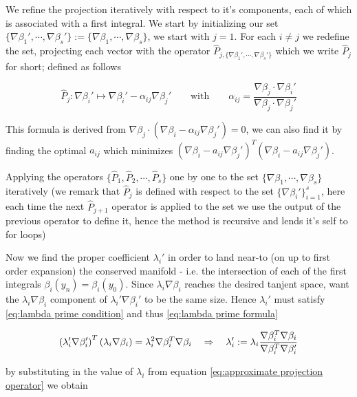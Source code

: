 \documentclass[12pt]{article}
\begin{document}
We refine the projection iteratively with respect to it's components, each of which is associated with a first integral. We start by initializing our set $\{\nabla \beta_1' ,\cdots , \nabla\beta_s'\} := \{\nabla \beta_1 ,\cdots ,\nabla \beta_s \}$, we start with $j=1$. For each $i\neq j$ we redefine the set, projecting each vector with the operator $\hat P_{j,\{\nabla\beta_1',\cdots,\nabla\beta_s'\}}$ which we write $\hat P_{j}$ for short; defined as follows

\begin{equation}\label{eq:first coefficient}
    \hat P_j : \nabla\beta_i' \mapsto \nabla\beta_i' - \alpha_{ij}\nabla\beta_j' \qquad\text{with}\qquad \alpha_{ij} = \frac{\nabla\beta_j \cdot\nabla\beta_i'}{\nabla\beta_j\cdot\nabla\beta_j'} 
\end{equation}

This formula is derived from $\nabla\beta_j\cdot (\nabla\beta_i - \alpha_{ij}\nabla\beta_j')  = 0$, we can also find it by finding the optimal $a_{ij}$ which minimizes $(\nabla\beta_i - a_{ij}\nabla\beta_j')^T(\nabla\beta_i - a_{ij}\nabla\beta_j')$. 

Applying the operators $\{\hat P_1 , \hat P_2,\cdots ,\hat P_s \}$ one by one to the set $\{\nabla\beta_1,\cdots,\nabla\beta_s\}$ iteratively (we remark that $\hat P_j$ is defined with respect to the set $\{\nabla\beta_i'\}_{i=1}^s$, here each time the next $\hat P_{j+1}$ operator is applied to the set we use the output of the previous operator to define it, hence the method is recursive and lends it's self to for loops)

Now we find the proper coefficient $\lambda_i'$ in order to land near-to (on up to first order expansion) the conserved manifold - i.e. the intersection of each of the first integrals $\beta_i(y_n) = \beta_i(y_0)$. Since $\lambda_i\nabla\beta_i$ reaches the desired tanjent space, want the $\lambda_i\nabla\beta_i$ component of $\lambda_i'\nabla\beta_i'$ to be the same size. Hence $\lambda_i'$ must satisfy \eqref{eq:lambda prime condition} and thus \eqref{eq:lambda prime formula}

\begin{equation}\label{eq:lambda prime condition}
    \left( \lambda_i'\nabla\beta_i' \right)^T \left( \lambda_i\nabla\beta_i \right) = \lambda_i^2 \nabla\beta_i^T\nabla\beta_i \quad\Rightarrow\quad \lambda_i' := \lambda_i \frac{\nabla\beta_i^T \nabla\beta_i}{\nabla\beta_i^T \nabla\beta_i'}
\end{equation}

by substituting in the value of $\lambda_i$ from equation \eqref{eq:approximate projection operator} we obtain
\end{document}
